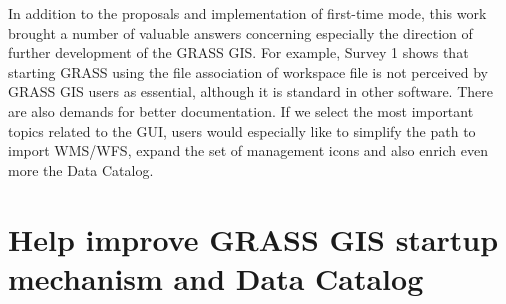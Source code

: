 \documentclass[a4paper,10pt,twoside]{article}
\begin{document}
In addition to the proposals and implementation of first-time mode,
this work brought a number of valuable answers concerning especially
the direction of further development of the GRASS GIS. For example,
Survey 1 shows that starting GRASS using the file association of
workspace file is not perceived by GRASS GIS users as essential,
although it is standard in other software. There are also demands for
better documentation. If we select the most important topics related
to the GUI, users would especially like to simplify the path to import
WMS/WFS, expand the set of management icons and also enrich even more
the Data Catalog.


\newpage
\vspace*{-6ex}
\renewcommand{\refname}{References} 
	
	

\noindent
\large

\newpage
\vspace*{-1cm}
\appendix
\section{Help improve GRASS GIS startup mechanism and Data Catalog }
\label{appendix:A}
\setcounter{page}{1}  %
 
\end{document}
